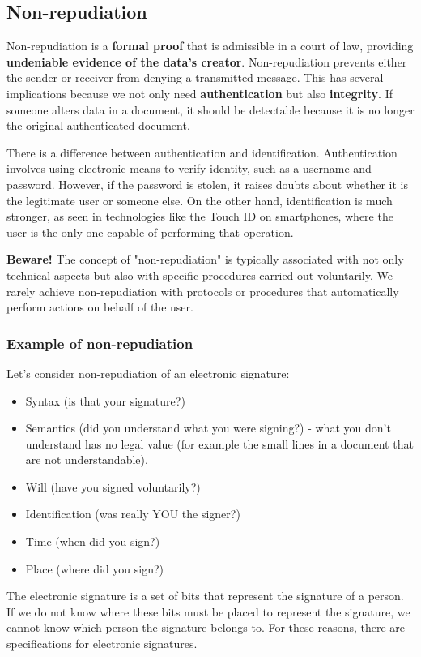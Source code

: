 \subsection{Non-repudiation}
Non-repudiation is a \textbf{formal proof} that is admissible in a court of law, providing \textbf{undeniable evidence of the data's creator}. Non-repudiation prevents either the sender or receiver from denying a transmitted message. This has several implications because we not only need \textbf{authentication} but also \textbf{integrity}. If someone alters data in a document, it should be detectable because it is no longer the original authenticated document.

There is a difference between authentication and identification. Authentication involves using electronic means to verify identity, such as a username and password. However, if the password is stolen, it raises doubts about whether it is the legitimate user or someone else. On the other hand, identification is much stronger, as seen in technologies like the Touch ID on smartphones, where the user is the only one capable of performing that operation.

\textbf{Beware!} The concept of "non-repudiation" is typically associated with not only technical aspects but also with specific procedures carried out voluntarily. We rarely achieve non-repudiation with protocols or procedures that automatically perform actions on behalf of the user.

\subsubsection*{Example of non-repudiation}
Let's consider non-repudiation of an electronic signature:
\begin{itemize}
  \item Syntax (is that your signature?)
  \item Semantics (did you understand what you were signing?) - what you don't understand has no legal value (for example the small lines in a document that are not understandable).
  \item Will (have you signed voluntarily?)
  \item Identification (was really YOU the signer?)
  \item Time (when did you sign?)
  \item Place (where did you sign?)
\end{itemize}
The electronic signature is a set of bits that represent the signature of a person. If we do not know where these bits must be placed to represent the signature, we cannot know which person the signature belongs to. For these reasons, there are specifications for electronic signatures.


